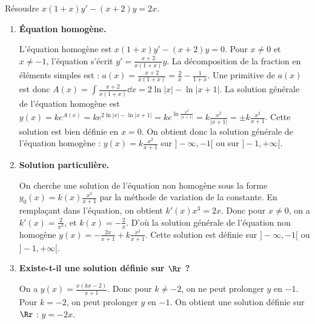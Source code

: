 \documentclass[class=report,crop=false]{standalone}
\begin{document}
\begin{exemple}
Résoudre $x(1+x)y'-(x+2)y=2x$.

\begin{enumerate}
  \item \textbf{Équation homogène.}

  L'équation homogène est $x(1+x)y'-(x+2)y=0$.
Pour $x\neq 0$ et $x\neq -1$, l'équation s'écrit $y'=\frac{x+2}{x(1+x)}y$.
La décomposition de la fraction en éléments simples est :
$a(x) = \frac{x+2}{x(1+x)}=\frac{2}{x}-\frac{1}{1+x}$.
Une primitive de $a(x)$ est donc
$A(x) = \int \frac{x+2}{x(1+x)} \dd x = 2\ln |x|-\ln|x+1|$.
La solution générale de l'équation homogène est
$y(x)= k e^{A(x)}= k e^{2\ln |x|-\ln|x+1|}
= k e^{\ln \frac{x^2}{|x+1|}}=k\frac{x^2}{|x+1|} =\pm k\frac{x^2}{x+1}$.
Cette solution est bien définie en $x=0$.
On obtient donc la solution générale de l'équation homogène :
$y(x)=k\frac{x^2}{x+1}$ sur $]-\infty, -1[$ ou sur $]-1,+\infty[$.


  \item \textbf{Solution particulière.}

On cherche une solution de l'équation non homogène sous la forme
$y_0(x)=k(x)\frac{x^2}{x+1}$ par la méthode de variation de la constante.
En remplaçant dans l'équation, on
obtient $k'(x)x^3=2x$. Donc pour $x\neq 0$, on a
$k'(x)=\frac{2}{x^2}$, et $k(x)=-\frac{2}{x}$.
D'où la solution générale de l'équation non homogène
$y(x)=-\frac{2x}{x+1} +k\frac{x^2}{x+1}$. Cette solution est définie
sur $]-\infty, -1[$ ou $]-1,+\infty[$.

  \item \textbf{Existe-t-il une solution définie sur $\Rr$ ?}

  On a $y(x)=\frac{x(k x-2)}{x+1}$. Donc pour $k\neq -2$, on ne peut
prolonger $y$ en $-1$.
Pour $k=-2$, on peut prolonger $y$ en $-1$. On obtient une solution
définie sur $\Rr$ : $y=-2x$.

\end{enumerate}

\end{exemple}
\end{document}
